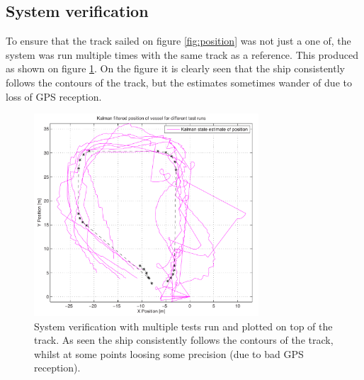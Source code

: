 \documentclass[journal]{IEEEtran}
\begin{document}
\subsection{System verification}
To ensure that the track sailed on figure \ref{fig:position} was not just a one of, the system was run multiple times with the same track as a reference. This produced as shown on figure \ref{fig:position2}. On the figure it is clearly seen that the ship consistently follows the contours of the track, but the estimates sometimes wander of due to loss of GPS reception.
\begin{figure}
	\begin{center}
		\includegraphics[width=8.4cm]{img/position2}    %
		\caption{System verification with multiple tests run and plotted on top of the track. As seen the ship consistently follows the contours of the track, whilst at some points loosing some precision (due to bad GPS reception).}  %
		\label{fig:position2}               
	\end{center}                                 %
\end{figure}
\end{document}
